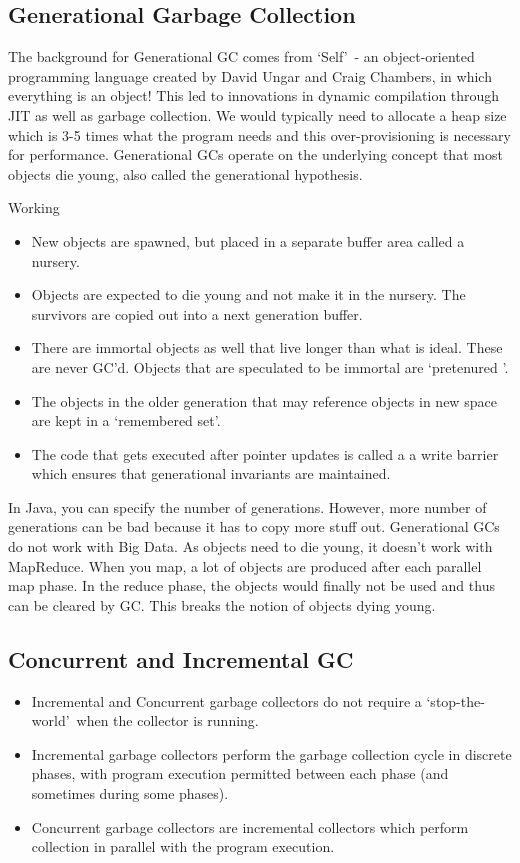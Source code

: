 \documentclass[twoside]{article}
\begin{document}
	\subsection{Generational Garbage Collection}
	The background for Generational GC comes from \lq Self\rq \, - an object-oriented programming language created by David Ungar and Craig Chambers, in which everything is an object! This led to innovations in dynamic compilation through JIT as well as garbage collection. We would typically need to allocate a heap size which is 3-5 times what the program needs and this over-provisioning is necessary for performance.
	Generational GCs operate on the underlying concept that most objects die young, also called the generational hypothesis.
	
	{\large Working}
	\begin{itemize}
		\item New objects are spawned, but placed in a separate buffer area called a nursery.
		\item Objects are expected to die young and not make it in the nursery. The survivors are copied out into a next generation buffer.
		\item There are immortal objects as well that live longer than what is ideal. These are never GC'd. Objects that are speculated to be immortal are \lq pretenured \rq.
		\item The objects in the older generation that may reference objects in new space are kept in a \lq remembered set\rq.
		\item The code that gets executed after pointer updates is called a a write barrier which ensures that generational invariants are maintained.
	\end{itemize}
	
	In Java, you can specify the number of generations. However, more number of generations can be bad because it has to copy more stuff out. \newline Generational GCs do not work with Big Data. As objects need to die young, it doesn't work with MapReduce. When you map, a lot of objects are produced after each parallel map phase. In the reduce phase, the objects would finally not be used and thus can be cleared by GC. This breaks the notion of objects dying young.
	
	\subsection{Concurrent and Incremental GC}
	\begin{itemize}
		\item Incremental and Concurrent garbage collectors do not require a \lq stop-the-world\rq \, when the collector is running.
		\item Incremental garbage collectors perform the garbage collection cycle in discrete phases, with program execution permitted between each phase (and sometimes during some phases).
		\item Concurrent garbage collectors are incremental collectors which perform collection in parallel with the program execution. 
	\end{itemize}
	
\end{document}
